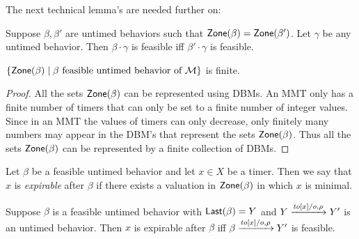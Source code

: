 The next technical lemma's are needed further on:

\begin{lemma}
\label{lemma: feasibility concatenation}
Suppose $\beta, \beta'$ are untimed behaviors such that
$\mathsf{Zone}({\beta}) = \mathsf{Zone}({\beta'})$. Let $\gamma$ be any untimed behavior.
Then $\beta \cdot \gamma$ is feasible iff $\beta' \cdot \gamma$ is feasible.
\end{lemma}

\begin{lemma}
\label{lemma finitely many zones}
$\{ \mathsf{Zone}({\beta}) \mid \beta \mbox{ feasible untimed behavior of } {\mathcal M} \}$ is finite.
\end{lemma}
\begin{proof}
All the sets $\mathsf{Zone}({\beta})$ can be represented using DBMs. An MMT only has a finite number of timers that can only be set to a finite number of integer values. Since in an MMT the values of timers can only decrease, only finitely many numbers may
appear in the DBM's that represent the sets $\mathsf{Zone}({\beta})$. Thus all the sets $\mathsf{Zone}({\beta})$ can be represented by a finite
collection of DBMs.
\end{proof}

Let $\beta$ be a feasible untimed behavior and let $x \in X$ be a timer. Then we say that $x$ is \emph{expirable} after $\beta$
if there exists a valuation in $\mathsf{Zone}({\beta})$ in which $x$ is minimal.

\begin{lemma}
\label{expirable}
Suppose $\beta$ is a feasible untimed behavior with $\mathsf{Last}({\beta}) = Y$ and $Y \xrightarrow{\mathit{to}[x]/o, \rho} Y'$ is an untimed behavior.
Then $x$ is expirable after $\beta$ iff $\beta \xrightarrow{\mathit{to}[x]/o, \rho} Y'$ is feasible.
\end{lemma}

